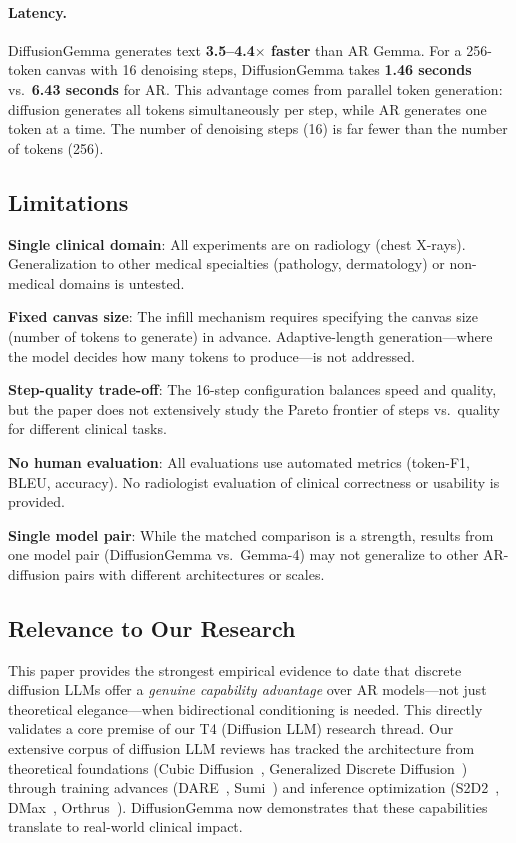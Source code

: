 \documentclass[11pt,a4paper]{article}
\begin{document}
\paragraph{Latency.} DiffusionGemma generates text \textbf{3.5--4.4$\times$ faster} than AR Gemma. For a 256-token canvas with 16 denoising steps, DiffusionGemma takes \textbf{1.46 seconds} vs.\ \textbf{6.43 seconds} for AR. This advantage comes from parallel token generation: diffusion generates all tokens simultaneously per step, while AR generates one token at a time. The number of denoising steps (16) is far fewer than the number of tokens (256).

\subsection{Limitations}

\textbf{Single clinical domain}: All experiments are on radiology (chest X-rays). Generalization to other medical specialties (pathology, dermatology) or non-medical domains is untested.

\textbf{Fixed canvas size}: The infill mechanism requires specifying the canvas size (number of tokens to generate) in advance. Adaptive-length generation---where the model decides how many tokens to produce---is not addressed.

\textbf{Step-quality trade-off}: The 16-step configuration balances speed and quality, but the paper does not extensively study the Pareto frontier of steps vs.\ quality for different clinical tasks.

\textbf{No human evaluation}: All evaluations use automated metrics (token-F1, BLEU, accuracy). No radiologist evaluation of clinical correctness or usability is provided.

\textbf{Single model pair}: While the matched comparison is a strength, results from one model pair (DiffusionGemma vs.\ Gemma-4) may not generalize to other AR-diffusion pairs with different architectures or scales.

\subsection{Relevance to Our Research}

This paper provides the strongest empirical evidence to date that discrete diffusion LLMs offer a \emph{genuine capability advantage} over AR models---not just theoretical elegance---when bidirectional conditioning is needed. This directly validates a core premise of our T4 (Diffusion LLM) research thread. Our extensive corpus of diffusion LLM reviews has tracked the architecture from theoretical foundations (Cubic Diffusion~\cite{cubic2026}, Generalized Discrete Diffusion~\cite{gdd2026}) through training advances (DARE~\cite{dare2026}, Sumi~\cite{sumi2026}) and inference optimization (S2D2~\cite{s2d2_2026}, DMax~\cite{dmax2026}, Orthrus~\cite{orthrus2026}). DiffusionGemma now demonstrates that these capabilities translate to real-world clinical impact.
\end{document}
